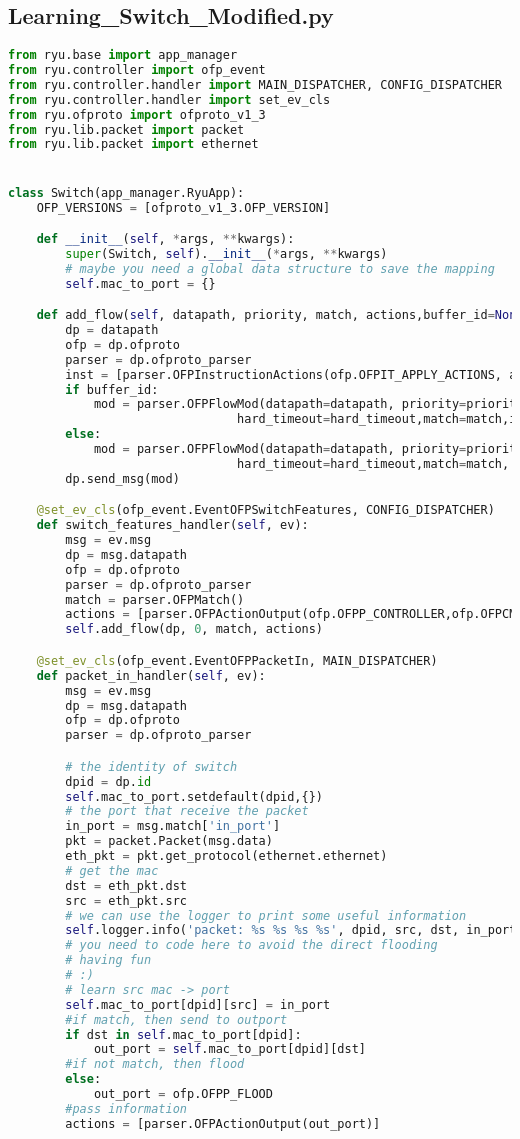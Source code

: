 \documentclass{xjtureport}
\begin{document}
\subsection{Learning\_Switch\_Modified.py}
\begin{lstlisting}[language=Python]
from ryu.base import app_manager 
from ryu.controller import ofp_event 
from ryu.controller.handler import MAIN_DISPATCHER, CONFIG_DISPATCHER 
from ryu.controller.handler import set_ev_cls 
from ryu.ofproto import ofproto_v1_3 
from ryu.lib.packet import packet 
from ryu.lib.packet import ethernet 


class Switch(app_manager.RyuApp): 
	OFP_VERSIONS = [ofproto_v1_3.OFP_VERSION] 

	def __init__(self, *args, **kwargs): 
		super(Switch, self).__init__(*args, **kwargs)
		# maybe you need a global data structure to save the mapping 
		self.mac_to_port = {}

	def add_flow(self, datapath, priority, match, actions,buffer_id=None,idle_timeout=0,hard_timeout=0):
		dp = datapath 
		ofp = dp.ofproto 
		parser = dp.ofproto_parser 
		inst = [parser.OFPInstructionActions(ofp.OFPIT_APPLY_ACTIONS, actions)] 
		if buffer_id: 
			mod = parser.OFPFlowMod(datapath=datapath, priority=priority,buffer_id=buffer_id,idle_timeout=idle_timeout,
								hard_timeout=hard_timeout,match=match,instructions=inst)
		else:
			mod = parser.OFPFlowMod(datapath=datapath, priority=priority,idle_timeout=idle_timeout,
								hard_timeout=hard_timeout,match=match, instructions=inst)	
		dp.send_msg(mod) 

	@set_ev_cls(ofp_event.EventOFPSwitchFeatures, CONFIG_DISPATCHER) 
	def switch_features_handler(self, ev): 
		msg = ev.msg 
		dp = msg.datapath 
		ofp = dp.ofproto 
		parser = dp.ofproto_parser
		match = parser.OFPMatch() 
		actions = [parser.OFPActionOutput(ofp.OFPP_CONTROLLER,ofp.OFPCML_NO_BUFFER)] 
		self.add_flow(dp, 0, match, actions)

	@set_ev_cls(ofp_event.EventOFPPacketIn, MAIN_DISPATCHER) 
	def packet_in_handler(self, ev): 
		msg = ev.msg 
		dp = msg.datapath 
		ofp = dp.ofproto 
		parser = dp.ofproto_parser 

		# the identity of switch 
		dpid = dp.id 
		self.mac_to_port.setdefault(dpid,{}) 
		# the port that receive the packet 
		in_port = msg.match['in_port']
		pkt = packet.Packet(msg.data) 
		eth_pkt = pkt.get_protocol(ethernet.ethernet) 
		# get the mac 
		dst = eth_pkt.dst 
		src = eth_pkt.src 
		# we can use the logger to print some useful information 
		self.logger.info('packet: %s %s %s %s', dpid, src, dst, in_port)
		# you need to code here to avoid the direct flooding 
		# having fun 
		# :)
		# learn src mac -> port
		self.mac_to_port[dpid][src] = in_port
		#if match, then send to outport
		if dst in self.mac_to_port[dpid]:
			out_port = self.mac_to_port[dpid][dst]
		#if not match, then flood
		else:
			out_port = ofp.OFPP_FLOOD
		#pass information
		actions = [parser.OFPActionOutput(out_port)]


\end{lstlisting}
\end{document}
